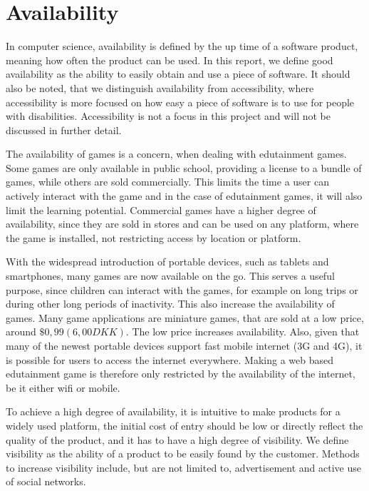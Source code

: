 \section{Availability}
\label{sec:availability}
In computer science, availability is defined by the up time of a software product, meaning how often the product can be used.\cite{defAvailability}
In this report, we define good availability as the ability to easily obtain and use a piece of software.
It should also be noted, that we distinguish availability from accessibility, where accessibility is more focused on how easy a piece of software is to use for people with disabilities.
Accessibility is not a focus in this project and will not be discussed in further detail.\newline

The availability of games is a concern, when dealing with edutainment games.
Some games are only available in public school, providing a license to a bundle of games, while others are sold commercially.
This limits the time a user can actively interact with the game and in the case of edutainment games, it will also limit the learning potential.
Commercial games have a higher degree of availability, since they are sold in stores and can be used on any platform, where the game is installed, not restricting access by location or platform.\newline

With the widespread introduction of portable devices, such as tablets and smartphones, many games are now available on the go.
This serves a useful purpose, since children can interact with the games, for example on long trips or during other long periods of inactivity.
This also increase the availability of games.
Many game applications are miniature games, that are sold at a low price, around $\$0,99 (6,00 DKK)$.
The low price increases availability.
Also, given that many of the newest portable devices support fast mobile internet (3G and 4G), it is possible for users to access the internet everywhere.
Making a web based edutainment game is therefore only restricted by the availability of the internet, be it either wifi or mobile.\newline

To achieve a high degree of availability, it is intuitive to make products for a widely used platform, the initial cost of entry should be low or directly reflect the quality of the product, and it has to have a high degree of visibility.
We define visibility as the ability of a product to be easily found by the customer.
Methods to increase visibility include, but are not limited to, advertisement and active use of social networks.